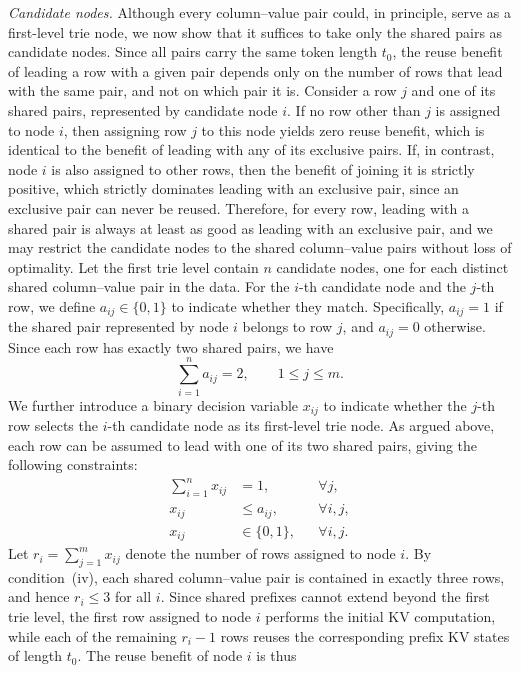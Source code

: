 \emph{Candidate nodes.} Although every column--value pair could, in principle, serve as a first-level trie node, we now show that it suffices to take only the shared pairs as candidate nodes. Since all pairs carry the same token length $t_0$, the reuse benefit of leading a row with a given pair depends only on the number of rows that lead with the same pair, and not on which pair it is. Consider a row $j$ and one of its shared pairs, represented by candidate node $i$. If no row other than $j$ is assigned to node $i$, then assigning row $j$ to this node yields zero reuse benefit, which is identical to the benefit of leading with any of its exclusive pairs. If, in contrast, node $i$ is also assigned to other rows, then the benefit of joining it is strictly positive, which strictly dominates leading with an exclusive pair, since an exclusive pair can never be reused. Therefore, for every row, leading with a shared pair is always at least as good as leading with an exclusive pair, and we may restrict the candidate nodes to the shared column--value pairs without loss of optimality. Let the first trie level contain $n$ candidate nodes, one for each distinct shared column--value pair in the data. For the $i$-th candidate node and the $j$-th row, we define $a_{ij}\in\{0,1\}$ to indicate whether they match. Specifically, $a_{ij}=1$ if the shared pair represented by node $i$ belongs to row $j$, and $a_{ij}=0$ otherwise. Since each row has exactly two shared pairs, we have
\begin{equation}
\sum_{i=1}^{n}a_{ij}=2, \qquad 1\leq j\leq m.
\label{eq:supp-match}
\end{equation}
We further introduce a binary decision variable $x_{ij}$ to indicate whether the $j$-th row selects the $i$-th candidate node as its first-level trie node. As argued above, each row can be assumed to lead with one of its two shared pairs, giving the following constraints:
\begin{equation}
\begin{aligned}
\sum_{i=1}^{n}x_{ij} &= 1, && \forall j,\\
x_{ij} &\leq a_{ij}, && \forall i,j,\\
x_{ij} &\in\{0,1\}, && \forall i,j.
\end{aligned}
\label{eq:supp-constraints}
\end{equation}
Let $r_i=\sum_{j=1}^{m}x_{ij}$ denote the number of rows assigned to node $i$. 
By condition~(iv), each shared column--value pair is contained
in exactly three rows, and hence $r_i \leq 3$ for all $i$.
Since shared prefixes cannot extend beyond the first trie level, the first row assigned to node $i$ performs the initial KV computation, while each of the remaining $r_i-1$ rows reuses the corresponding prefix KV states of length $t_0$. The reuse benefit of node $i$ is thus
